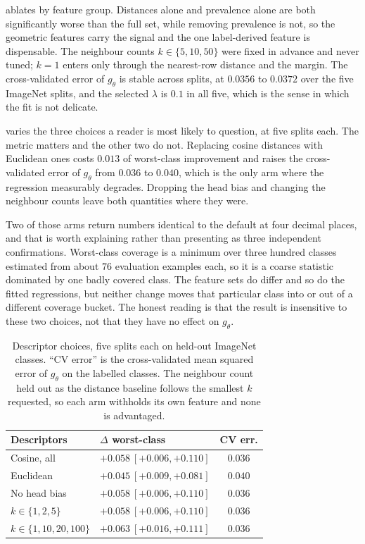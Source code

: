  ablates by feature group. Distances alone and prevalence alone are both
significantly worse than the full set, while removing prevalence is not, so the geometric
features carry the signal and the one label-derived feature is dispensable. The neighbour
counts $k\in\{5,10,50\}$ were fixed in advance and never tuned; $k=1$ enters only through the
nearest-row distance and the margin. The cross-validated error of $g_\theta$ is stable across
splits, at $0.0356$ to $0.0372$ over the five ImageNet splits, and the selected $\lambda$ is
$0.1$ in all five, which is the sense in which the fit is not delicate.

 varies the three choices a reader is most likely to question, at five
splits each. The metric matters and the other two do not. Replacing cosine distances with
Euclidean ones costs $0.013$ of worst-class improvement and raises the cross-validated error of
$g_\theta$ from $0.036$ to $0.040$, which is the only arm where the regression measurably
degrades. Dropping the head bias and changing the neighbour counts leave both quantities where
they were.

Two of those arms return numbers identical to the default at four decimal places, and that is
worth explaining rather than presenting as three independent confirmations. Worst-class
coverage is a minimum over three hundred classes estimated from about $76$ evaluation examples
each, so it is a coarse statistic dominated by one badly covered class. The feature sets do
differ and so do the fitted regressions, but neither change moves that particular class into or
out of a different coverage bucket. The honest reading is that the result is insensitive to
these two choices, not that they have no effect on $g_\theta$.

\begin{table}[h]
\centering
\small
\setlength{\tabcolsep}{3pt}
\begin{tabular}{@{}llc@{}}
\toprule
Descriptors & $\Delta$ worst-class & CV err. \\
\midrule
Cosine, all       & $+0.058\ [+0.006,+0.110]$ & $0.036$ \\
Euclidean         & $+0.045\ [+0.009,+0.081]$ & $0.040$ \\
No head bias      & $+0.058\ [+0.006,+0.110]$ & $0.036$ \\
$k\in\{1,2,5\}$   & $+0.058\ [+0.006,+0.110]$ & $0.036$ \\
$k\in\{1,10,20,100\}$ & $+0.063\ [+0.016,+0.111]$ & $0.036$ \\
\bottomrule
\end{tabular}
\caption{Descriptor choices, five splits each on held-out ImageNet classes. ``CV error'' is the
cross-validated mean squared error of $g_\theta$ on the labelled classes. The neighbour count
held out as the distance baseline follows the smallest $k$ requested, so each arm withholds its
own feature and none is advantaged.}
\label{tab:descriptors}
\end{table}


